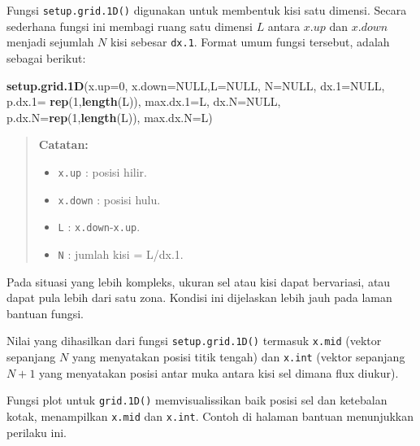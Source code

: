 \documentclass[
]{book}
\newenvironment{Shaded}{\begin{snugshade}}{\end{snugshade}}
\newcommand{\AttributeTok}[1]{\textcolor[rgb]{0.13,0.29,0.53}{#1}}
\newcommand{\ConstantTok}[1]{\textcolor[rgb]{0.56,0.35,0.01}{#1}}
\newcommand{\DecValTok}[1]{\textcolor[rgb]{0.00,0.00,0.81}{#1}}
\newcommand{\FunctionTok}[1]{\textcolor[rgb]{0.13,0.29,0.53}{\textbf{#1}}}
\newcommand{\NormalTok}[1]{#1}
\providecommand{\tightlist}{%
  \setlength{\itemsep}{0pt}\setlength{\parskip}{0pt}}
\theoremstyle{definition}
\theoremstyle{definition}
\theoremstyle{definition}
\theoremstyle{definition}
\theoremstyle{remark}
\begin{document}
Fungsi \texttt{setup.grid.1D()} digunakan untuk membentuk kisi satu dimensi. Secara sederhana fungsi ini membagi ruang satu dimensi \(L\) antara \(x.up\) dan \(x.down\) menjadi sejumlah \(N\) kisi sebesar \texttt{dx.1}. Format umum fungsi tersebut, adalah sebagai berikut:

\begin{Shaded}
\begin{Highlighting}[]
\FunctionTok{setup.grid.1D}\NormalTok{(}\AttributeTok{x.up=}\DecValTok{0}\NormalTok{, }\AttributeTok{x.down=}\ConstantTok{NULL}\NormalTok{,}\AttributeTok{L=}\ConstantTok{NULL}\NormalTok{, }
              \AttributeTok{N=}\ConstantTok{NULL}\NormalTok{, }\AttributeTok{dx.1=}\ConstantTok{NULL}\NormalTok{, }
              \AttributeTok{p.dx.1=} \FunctionTok{rep}\NormalTok{(}\DecValTok{1}\NormalTok{,}\FunctionTok{length}\NormalTok{(L)), }
              \AttributeTok{max.dx.1=}\NormalTok{L, }\AttributeTok{dx.N=}\ConstantTok{NULL}\NormalTok{, }
              \AttributeTok{p.dx.N=}\FunctionTok{rep}\NormalTok{(}\DecValTok{1}\NormalTok{,}\FunctionTok{length}\NormalTok{(L)), }
              \AttributeTok{max.dx.N=}\NormalTok{L)}
\end{Highlighting}
\end{Shaded}

\begin{quote}
\textbf{Catatan:}

\begin{itemize}
\tightlist
\item
  \texttt{x.up} : posisi hilir.
\item
  \texttt{x.down} : posisi hulu.
\item
  \texttt{L} : \texttt{x.down}-\texttt{x.up}.
\item
  \texttt{N} : jumlah kisi = L/dx.1.
\end{itemize}
\end{quote}

Pada situasi yang lebih kompleks, ukuran sel atau kisi dapat bervariasi, atau dapat pula lebih dari satu zona. Kondisi ini dijelaskan lebih jauh pada laman bantuan fungsi.

Nilai yang dihasilkan dari fungsi \texttt{setup.grid.1D()} termasuk \texttt{x.mid} (vektor sepanjang \(N\) yang menyatakan posisi titik tengah) dan \texttt{x.int} (vektor sepanjang \(N+1\) yang menyatakan posisi antar muka antara kisi sel dimana flux diukur).

Fungsi plot untuk \texttt{grid.1D()} memvisualissikan baik posisi sel dan ketebalan kotak, menampilkan \texttt{x.mid} dan \texttt{x.int}. Contoh di halaman bantuan menunjukkan perilaku ini.
\end{document}
